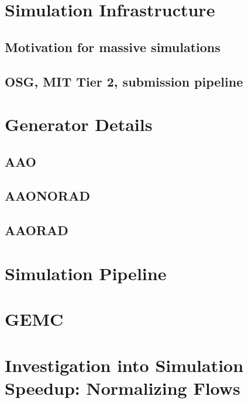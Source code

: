 \section{Simulation Infrastructure}
    \subsection{Motivation for massive simulations}
    \subsection{OSG, MIT Tier 2, submission pipeline}

\section{Generator Details}
    \subsection{AAO}
        \subsection{AAONORAD}
        \subsection{AAORAD}

\section{Simulation Pipeline}
    \section{GEMC}

\section{Investigation into Simulation Speedup: Normalizing Flows}